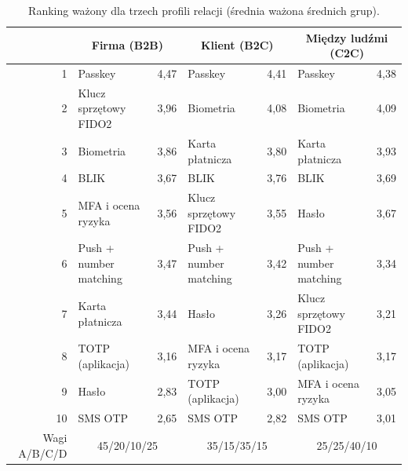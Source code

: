 \begin{table}[ht]
\centering
\caption{Ranking ważony dla trzech profili relacji (średnia ważona średnich grup).}
\label{tab:ranking}
\small
\begin{tabular}{rlclclc}
\toprule
 & \multicolumn{2}{c}{Firma (B2B)} & \multicolumn{2}{c}{Klient (B2C)} & \multicolumn{2}{c}{Między ludźmi (C2C)} \\
\midrule
1 & Passkey & 4,47 & Passkey & 4,41 & Passkey & 4,38 \\
2 & Klucz sprzętowy FIDO2 & 3,96 & Biometria & 4,08 & Biometria & 4,09 \\
3 & Biometria & 3,86 & Karta płatnicza & 3,80 & Karta płatnicza & 3,93 \\
4 & BLIK & 3,67 & BLIK & 3,76 & BLIK & 3,69 \\
5 & MFA i ocena ryzyka & 3,56 & Klucz sprzętowy FIDO2 & 3,55 & Hasło & 3,67 \\
6 & Push + number matching & 3,47 & Push + number matching & 3,42 & Push + number matching & 3,34 \\
7 & Karta płatnicza & 3,44 & Hasło & 3,26 & Klucz sprzętowy FIDO2 & 3,21 \\
8 & TOTP (aplikacja) & 3,16 & MFA i ocena ryzyka & 3,17 & TOTP (aplikacja) & 3,17 \\
9 & Hasło & 2,83 & TOTP (aplikacja) & 3,00 & MFA i ocena ryzyka & 3,05 \\
10 & SMS OTP & 2,65 & SMS OTP & 2,82 & SMS OTP & 3,01 \\
\midrule
Wagi A/B/C/D & \multicolumn{2}{c}{45/20/10/25} & \multicolumn{2}{c}{35/15/35/15} & \multicolumn{2}{c}{25/25/40/10} \\
\bottomrule
\end{tabular}
\end{table}
